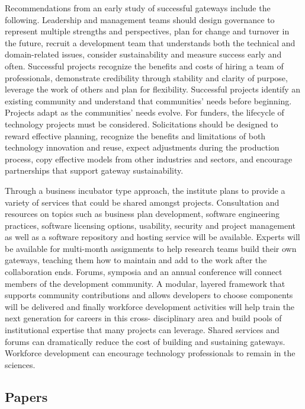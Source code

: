\documentclass[11pt, oneside]{amsart}
\begin{document}
Recommendations from an early study of successful gateways include the following. Leadership and management teams should
design governance to represent multiple strengths and perspectives, plan for change and turnover in the future,
recruit a development team that understands both the technical and domain-related issues, consider sustainability and measure success early and often.
Successful projects recognize the benefits and costs of hiring a team of professionals, demonstrate credibility through stability and
clarity of purpose, leverage the work of others and plan for flexibility.
Successful projects identify an existing community and understand that communities' needs before beginning. Projects adapt
as the communities' needs evolve. For funders, the lifecycle of technology projects must be considered. Solicitations should
be designed to reward effective planning, recognize the benefits and limitations of both technology innovation and reuse,
expect adjustments during the production process, copy effective models from other industries and sectors, and encourage partnerships that support gateway sustainability.

Through a business incubator type approach, the institute plans to provide a variety of services that could be shared amongst
projects. Consultation and resources on topics such as business plan development, software engineering practices,
software licensing options, usability, security and project management as well as a software repository and hosting
service will be available. Experts will be available for multi-month assignments to help research teams build their own gateways,
teaching them how to maintain and add to the work after the collaboration ends. Forums, symposia and an annual conference
will connect members of the development community. A modular, layered framework that supports community contributions and
allows developers to choose components will be delivered and finally
workforce development activities will help train the next generation for careers in this cross- disciplinary area and
build pools of institutional expertise that many projects can leverage. Shared services and forums can dramatically reduce the cost
of building and sustaining gateways. Workforce development can encourage technology professionals to remain in the sciences.


\subsection{Papers}
\end{document}

